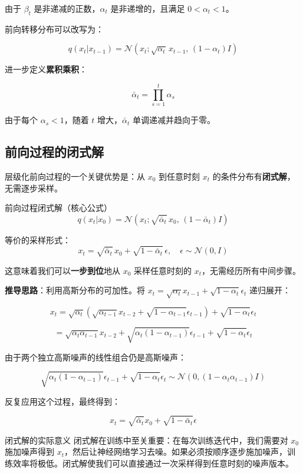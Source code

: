 \documentclass[a4paper]{article}
\begin{document}
由于 $\beta_t$ 是非递减的正数，$\alpha_t$ 是非递增的，且满足 $0 < \alpha_t < 1$。

前向转移分布可以改写为：

$$q(x_t | x_{t-1}) = \mathcal{N}(x_t; \sqrt{\alpha_t} \, x_{t-1}, \, (1 - \alpha_t) I)$$

进一步定义\textbf{累积乘积}：

$$\bar{\alpha}_t = \prod_{s=1}^{t} \alpha_s$$

由于每个 $\alpha_s < 1$，随着 $t$ 增大，$\bar{\alpha}_t$ 单调递减并趋向于零。

\subsection{前向过程的闭式解}

层级化前向过程的一个关键优势是：从 $x_0$ 到任意时刻 $x_t$ 的条件分布有\textbf{闭式解}，无需逐步采样。

\begin{importantbox}{前向过程闭式解（核心公式）}
$$q(x_t | x_0) = \mathcal{N}(x_t; \sqrt{\bar{\alpha}_t} \, x_0, \, (1 - \bar{\alpha}_t) I)$$

等价的采样形式：
$$x_t = \sqrt{\bar{\alpha}_t} \, x_0 + \sqrt{1 - \bar{\alpha}_t} \, \epsilon, \quad \epsilon \sim \mathcal{N}(0, I)$$

这意味着我们可以\textbf{一步到位}地从 $x_0$ 采样任意时刻的 $x_t$，无需经历所有中间步骤。
\end{importantbox}

\textbf{推导思路}：利用高斯分布的可加性。将 $x_t = \sqrt{\alpha_t} x_{t-1} + \sqrt{1-\alpha_t} \epsilon_t$ 递归展开：

$$x_t = \sqrt{\alpha_t} (\sqrt{\alpha_{t-1}} x_{t-2} + \sqrt{1-\alpha_{t-1}} \epsilon_{t-1}) + \sqrt{1-\alpha_t} \epsilon_t$$

$$= \sqrt{\alpha_t \alpha_{t-1}} x_{t-2} + \sqrt{\alpha_t(1-\alpha_{t-1})} \epsilon_{t-1} + \sqrt{1-\alpha_t} \epsilon_t$$

由于两个独立高斯噪声的线性组合仍是高斯噪声：

$$\sqrt{\alpha_t(1-\alpha_{t-1})} \epsilon_{t-1} + \sqrt{1-\alpha_t} \epsilon_t \sim \mathcal{N}(0, (1-\alpha_t\alpha_{t-1}) I)$$

反复应用这个过程，最终得到：

$$x_t = \sqrt{\bar{\alpha}_t} x_0 + \sqrt{1-\bar{\alpha}_t} \epsilon$$

\begin{knowledgebox}{闭式解的实际意义}
闭式解在训练中至关重要：在每次训练迭代中，我们需要对 $x_0$ 施加噪声得到 $x_t$，然后让神经网络学习去噪。如果必须按顺序逐步施加噪声，训练效率将极低。闭式解使我们可以直接通过一次采样得到任意时刻的噪声版本。
\end{knowledgebox}
\end{document}
